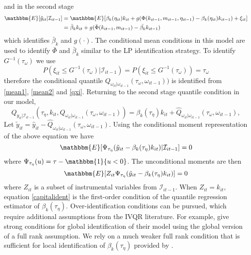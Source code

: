 \documentclass[11pt]{article}
\begin{document}
and in the second stage
\begin{equation}\label{mean2}
\begin{split}
\mathbbm{E}[\hat{y}_{it}|\mathcal{I}_{it-1}]&=\mathbbm{E}[\beta_{k}(\eta_{it})k_{it}+g(\Phi(k_{it-1}, m_{it-1}, \eta_{it-1})-\beta_{k}(\eta_{it})k_{it-1})+\xi_{it}]\\
&=\bar{\beta}_{k}k_{it}+g(\bar{\Phi}(k_{it-1}, m_{it-1})-\bar{\beta_{k}}k_{it-1})
\end{split}
\end{equation}
which identifies $\bar{\beta}_{k}$ and $g(\cdot)$. The conditional mean conditions in this model are used to identify $\bar{\Phi}$ and $\bar{\beta}_{k}$ similar to the LP identification strategy. To identify $G^{-1}(\tau_{\omega})$ we use
\begin{equation}\label{qxi}
P(\xi_{it}\leq G^{-1}(\tau_{\omega})|\mathcal{I}_{it-1})=P(\xi_{it}\leq G^{-1}(\tau_{\omega}))=\tau_{\omega}
\end{equation}
therefore the conditional quantile $ Q_{\omega_{it}|\omega_{it-1}}(\tau_{\omega}, \omega_{it-1}))$ is identified from \eqref{mean1}, \eqref{mean2} and \eqref{qxi}. Returning to the second stage quantile condition in our model,
\begin{equation*}
Q_{y_{it}|\mathcal{I}_{it-1}}(\tau_{\eta}, k_{it}, Q_{\omega_{it}|\omega_{it-1}}(\tau_{\omega}, \omega_{it-1}))=\beta_{k}(\tau_{\eta})k_{it}+\hat{Q}_{\omega_{it}|\omega_{it-1}}(\tau_{\omega}, \omega_{it-1}),
\end{equation*}
Let $\tilde{y}_{it}=\hat{y}_{it}-\hat{Q}_{\omega_{it}|\omega_{it-1}}(\tau_{\omega}, \omega_{it-1})$. Using the conditional moment representation of the above equation we have
\begin{equation}
\mathbbm{E}[\Psi_{\tau_{\eta}}(\tilde{y}_{it}-\beta_{k}(\tau_{\eta})k_{it})|\mathcal{I}_{it-1}]=0
\end{equation}
where $\Psi_{\tau_{\eta}}(u)=\tau-\mathbbm{1}\{u<0\}$. The unconditional moments are then
\begin{equation}\label{capitalident}
\mathbbm{E}[Z_{it}\Psi_{\tau_{\eta}}(\tilde{y}_{it}-\beta_{k}(\tau_{\eta})k_{it})]=0
\end{equation}
where $Z_{it}$ is a subset of instrumental variables from $\mathcal{I}_{it-1}$. When $Z_{it}=k_{it}$, equation \eqref{capitalident} is the first-order condition of the quantile regression estimator of $\beta_{k}(\tau_{\eta})$. Over-identification conditions can be pursued, which require additional assumptions from the IVQR literature. For example, \cite{Chernozhukov2005} give strong conditions for global identification of their model using the global version of a full rank assumption. We rely on a much weaker full rank condition that is sufficient for local identification of $\beta_{k}(\tau_{\eta})$ provided by \cite{qgmm}.
\end{document}

